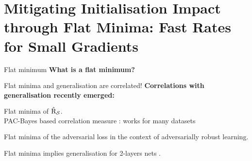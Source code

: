 \documentclass{presentation}
\begin{document}
\section{Mitigating Initialisation Impact through Flat Minima: Fast Rates for Small Gradients}

\begin{xframe}{Flat minimum}
    \textbf{What is a flat minimum?}
    \\
\end{xframe}


\begin{xframe}{Flat minima and generalisation are correlated!}
    \textbf{Correlations with generalisation recently emerged:}
    \vspace{0.5cm}
    \begin{xitemize}
        \item Flat minima of $\hat{\text{R}}_{\mathcal{S}}$.\\ PAC-Bayes based correlation measure : works for many datasets \citep{neyshabur2017explor,jiang2020fantastic,dziugaite2020search}
        \vspace{0.5cm}
        \item Flat minima of the adversarial loss in the context of adversarially robust learning. \citep{Stutz2021}
        \vspace{0.5cm}
        \item Flat minima implies generalisation for 2-layers nets \citep{wen2023sharpness}.
         
    \end{xitemize}
    \vspace{0.7cm}

    
\end{xframe}
\end{document}
